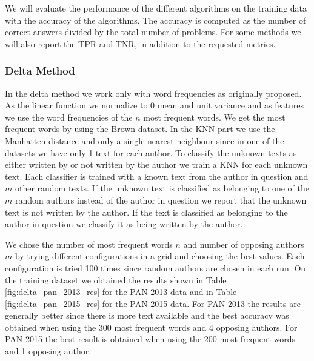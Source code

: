 We will evaluate the performance of the different algorithms on the training
data with the accuracy of the algorithms. The accuracy is computed as the number
of correct answers divided by the total number of problems. For some methods
we will also report the \gls{TPR} and \gls{TNR}, in addition to the requested
metrics.

\subsubsection{Delta Method} \label{subsubsec:method:delta_method}
In the delta method we work only with word frequencies as originally proposed.
As the linear function we normalize to 0 mean and unit variance and as features
we use the word frequencies of the $n$ most frequent words. We get the most
frequent words by using the Brown dataset. In the \gls{KNN} part we use the
Manhatten distance and only a single nearest neighbour since in one of the
datasets we have only 1 text for each author. To classify the unknown texts as
either written by or not written by the author we train a \gls{KNN} for each
unknown text. Each classifier is trained with a known text from the author
in question and $m$ other random texts. If the unknown text is classified as
belonging to one of the $m$ random authors instead of the author in question
we report that the unknown text is not written by the author. If the text is
classified as belonging to the author in question we classify it as being
written by the author.

We chose the number of most frequent words $n$ and number of opposing
authors $m$ by trying different configurations in a grid and choosing the
best values. Each configuration is tried 100 times since random authors are
chosen in each run. On the training dataset we obtained the results shown in
Table \ref{fig:delta_pan_2013_res} for the PAN 2013 data and in Table
\ref{fig:delta_pan_2015_res} for the PAN 2015 data. For PAN 2013 the results are
generally better since there is more text available and the best accuracy was
obtained when using the 300 most frequent words and 4 opposing authors. For PAN
2015 the best result is obtained when using the 200 most frequent words and 1
opposing author.

